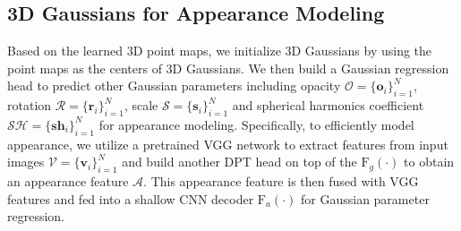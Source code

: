 
\subsection{3D Gaussians for Appearance Modeling}\label{method:apperance}

Based on the learned 3D point maps, we initialize 3D Gaussians by using the point maps as the centers of 3D Gaussians. We then build a Gaussian regression head to predict other Gaussian parameters including opacity $\mathcal{O} = \{\mathbf{o}_i\}_{i=1}^N$, rotation $\mathcal{R} = \{\mathbf{r}_i\}_{i=1}^N$, scale $\mathcal{S} = \{\mathbf{s}_i\}_{i=1}^N$ and spherical harmonics coefficient $\mathcal{SH} = \{\mathbf{sh}_i\}_{i=1}^N$ for appearance modeling. Specifically, to efficiently model appearance, we utilize a pretrained VGG network to extract features from input images $\mathcal{V} = \{\mathbf{v}_i\}_{i=1}^N$ and build another DPT head on top of the $\mathrm{F}_g(\cdot)$ to obtain an appearance feature $\mathcal{A}$. This appearance feature is then fused with VGG features and fed into a shallow CNN decoder $\mathrm{F}_a(\cdot)$ for Gaussian parameter regression.

